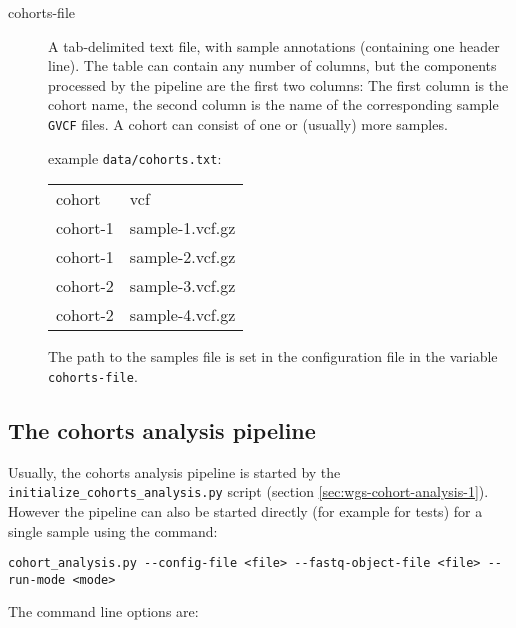 \documentclass[a4paper]{article}
\begin{document}
\begin{description}

\item[cohorts-file] A tab-delimited text file, with sample annotations
  (containing one header line). The table can contain any number of
  columns, but the components processed by the pipeline are the first
  two columns: The first column is the cohort name, the second column
  is the name of the corresponding sample \texttt{GVCF} files. A
  cohort can consist of one or (usually) more samples.

  example \texttt{data/cohorts.txt}:

  {\scriptsize
    {\ttfamily
      \begin{tabular}{ll}

        cohort & vcf \\
        cohort-1 & sample-1.vcf.gz \\
        cohort-1 & sample-2.vcf.gz \\
        cohort-2 & sample-3.vcf.gz \\
        cohort-2 & sample-4.vcf.gz \\
      \end{tabular}
    }
  }

  The path to the samples file is set in the configuration file in the
  variable \texttt{cohorts-file}.

\end{description}

\subsection{The cohorts analysis pipeline}
\label{sec:cohorts-analys-pipel-1}

Usually, the cohorts analysis pipeline is started by the
\texttt{initialize\_cohorts\_analysis.py} script (section
\ref{sec:wgs-cohort-analysis-1}). However the pipeline can also be
started directly (for example for tests) for a single sample using the
command:

\begin{lstlisting}
cohort_analysis.py --config-file <file> --fastq-object-file <file> --run-mode <mode>
\end{lstlisting}

The command line options are:
\end{document}
